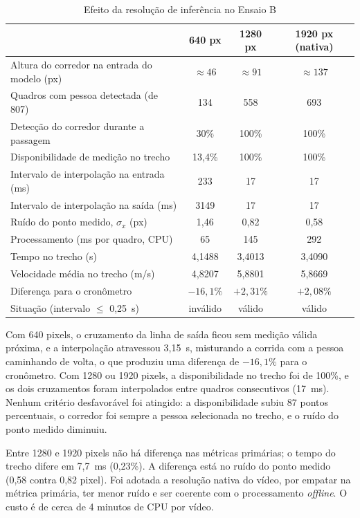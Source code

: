 \documentclass[
    12pt,               %
    openright,          %
    twoside,            %
    a4paper,            %
    chapter=TITLE,      %
    english,            %
    brazil              %
    ]{abntex2}
\begin{document}
\begin{table}[H]
\centering
\small
\caption{Efeito da resolução de inferência no Ensaio B}
\label{tab:imgsz}
\begin{tabular}{L{0.42\textwidth}ccc}
\hline
 & \textbf{640 px} & \textbf{1280 px} & \textbf{1920 px (nativa)} \\
\hline
Altura do corredor na entrada do modelo (px) & $\approx 46$ & $\approx 91$ & $\approx 137$ \\
Quadros com pessoa detectada (de 807) & 134 & 558 & 693 \\
Detecção do corredor durante a passagem & 30\% & 100\% & 100\% \\
Disponibilidade de medição no trecho & 13,4\% & 100\% & 100\% \\
Intervalo de interpolação na entrada (ms) & 233 & 17 & 17 \\
Intervalo de interpolação na saída (ms) & 3149 & 17 & 17 \\
Ruído do ponto medido, $\sigma_x$ (px) & 1,46 & 0,82 & 0,58 \\
Processamento (ms por quadro, CPU) & 65 & 145 & 292 \\
Tempo no trecho (s) & 4,1488 & 3,4013 & 3,4090 \\
Velocidade média no trecho (m/s) & 4,8207 & 5,8801 & 5,8669 \\
Diferença para o cronômetro & $-16{,}1\%$ & $+2{,}31\%$ & $+2{,}08\%$ \\
Situação (intervalo $\le$ 0,25~s) & inválido & válido & válido \\
\hline
\end{tabular}
\end{table}

Com 640 pixels, o cruzamento da linha de saída ficou sem medição válida próxima, e a interpolação atravessou 3,15~s, misturando a corrida com a pessoa caminhando de volta, o que produziu uma diferença de $-16{,}1\%$ para o cronômetro. Com 1280 ou 1920 pixels, a disponibilidade no trecho foi de 100\%, e os dois cruzamentos foram interpolados entre quadros consecutivos (17~ms). Nenhum critério desfavorável foi atingido: a disponibilidade subiu 87 pontos percentuais, o corredor foi sempre a pessoa selecionada no trecho, e o ruído do ponto medido diminuiu.

Entre 1280 e 1920 pixels não há diferença nas métricas primárias; o tempo do trecho difere em 7,7~ms (0,23\%). A diferença está no ruído do ponto medido (0,58 contra 0,82 pixel). Foi adotada a resolução nativa do vídeo, por empatar na métrica primária, ter menor ruído e ser coerente com o processamento \textit{offline}. O custo é de cerca de 4 minutos de CPU por vídeo.
\end{document}
